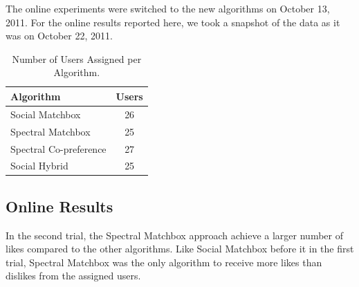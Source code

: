The online experiments were switched to the new algorithms on October 13, 2011. For the online results reported here, we took a snapshot of the data as it was on October 22, 2011.

\begin{table}[h!]
\centering
\begin{tabular}{| l | c |}
\hline
{\bf Algorithm} & {\bf Users} \\
\hline
Social Matchbox & 26\\
Spectral Matchbox  & 25 \\
Spectral Co-preference & 27 \\
Social Hybrid & 25 \\
\hline
\end{tabular}
\caption{Number of Users Assigned per Algorithm.}
\end{table}

\subsection{Online Results}

In the second trial, the Spectral Matchbox approach achieve a larger number of likes compared to the other algorithms. Like Social Matchbox before it in the first trial, Spectral Matchbox was the only algorithm to receive more likes than dislikes from the assigned users.

